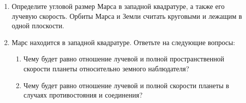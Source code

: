 \documentclass[12pt]{article}
\begin{document}
\begin{enumerate}
    \item Определите угловой размер Марса в западной квадратуре, а также его лучевую скорость. Орбиты Марса и Земли считать круговыми и лежащим в одной плоскости. 
    \item Марс находится в западной квадратуре. Ответьте на следующие вопросы: 
    \begin{enumerate}
        \item Чему будет равно отношение лучевой и полной пространственной скорости планеты относительно земного наблюдателя?
        \item Чему будет равно отношение лучевой и полной скорости планеты в случаях противостояния и соединения?
    \end{enumerate}
\end{enumerate}
\end{document}
